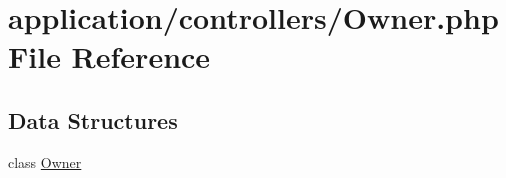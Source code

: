 \hypertarget{_owner_8php}{}\section{application/controllers/\+Owner.php File Reference}
\label{_owner_8php}
\subsection*{Data Structures}
\begin{DoxyCompactItemize}
\item 
class \mbox{\hyperlink{class_owner}{Owner}}
\end{DoxyCompactItemize}
